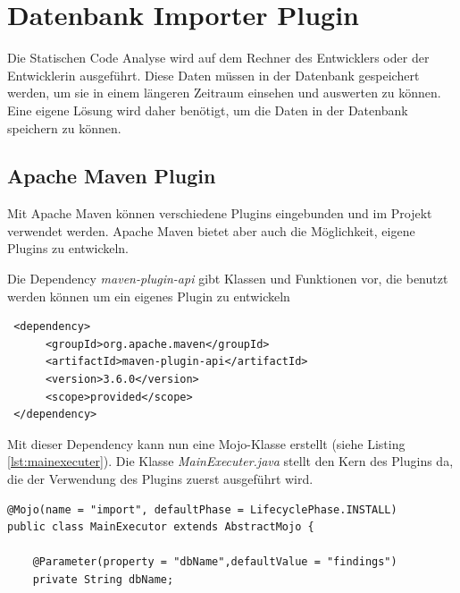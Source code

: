 \section{Datenbank Importer Plugin} 
Die Statischen Code Analyse wird auf dem Rechner des Entwicklers oder der Entwicklerin ausgeführt. Diese Daten müssen in der Datenbank gespeichert werden, um sie in einem längeren Zeitraum einsehen und auswerten zu können. Eine eigene Lösung wird daher benötigt, um die Daten in der Datenbank speichern zu können. 
\subsection{Apache Maven Plugin}
Mit Apache Maven können verschiedene Plugins eingebunden und im Projekt verwendet werden. Apache Maven bietet aber auch die Möglichkeit, eigene Plugins zu entwickeln.~\parencite{anardu2014maven}

Die Dependency \textit{maven-plugin-api} gibt Klassen und Funktionen vor, die benutzt werden können um ein eigenes Plugin zu entwickeln
\begin{verbatim}
 <dependency>
      <groupId>org.apache.maven</groupId>
      <artifactId>maven-plugin-api</artifactId>
      <version>3.6.0</version>
      <scope>provided</scope>
 </dependency>
\end{verbatim}

Mit dieser Dependency kann nun eine Mojo-Klasse erstellt (siehe Listing  \ref{lst:mainexecuter}). Die Klasse \textit{MainExecuter.java} stellt den Kern des Plugins da, die der Verwendung des Plugins zuerst ausgeführt wird.  ~\parencite{gonzalezMavenTutorial}

\lstset{
  caption={Kopf der Executor-Klasse: Sie wird mit dem Aufruf des Plugins zuerst gestartet.}, 
  basicstyle=\small\ttfamily, 
  label=lst:mainexecuter, 
  language=Java,
  frame=single,
  breaklines=true, %
  postbreak=\mbox{\textcolor{red}{$\hookrightarrow$}\space},
}

\begin{samepage}%
	\begin{lstlisting}[float=tbhp]
@Mojo(name = "import", defaultPhase = LifecyclePhase.INSTALL)
public class MainExecutor extends AbstractMojo {

    @Parameter(property = "dbName",defaultValue = "findings")
    private String dbName;
	\end{lstlisting}
\end{samepage}
	


